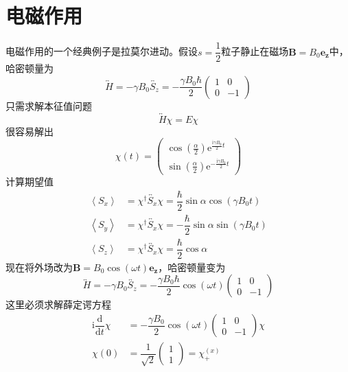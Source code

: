 \documentclass[12pt, a4paper, oneside]{ctexart}
\begin{document}
	\section{电磁作用}
	电磁作用的一个经典例子是拉莫尔进动。假设$s=\dfrac{1}{2}$粒子静止在磁场$\boldsymbol{B}=B_{0}\boldsymbol{e_{z}}$中，哈密顿量为
	\begin{equation}
		\overleftrightarrow{H}=-\gamma B_{0}\overleftrightarrow{S_{z}}=-\dfrac{\gamma B_{0}\hbar}{2}\begin{pmatrix}
			1	& 0\\
			0	&-1
		\end{pmatrix}
	\end{equation}
	\quad\quad 只需求解本征值问题
	\begin{equation}
		\overleftrightarrow{H}\chi=E\chi
	\end{equation}
	\quad\quad 很容易解出
	\begin{equation}
		\chi(t)=\begin{pmatrix}
		\cos(\frac{\alpha}{2})\mathrm{e}^{\frac{\mathrm{i}\gamma B_{0}}{2}t}	\\\sin(\frac{\alpha}{2})\mathrm{e}^{-\frac{\mathrm{i}\gamma B_{0}}{2}t}
		\end{pmatrix}
	\end{equation}
	\quad\quad 计算期望值
	\begin{align}
		\left<S_{x}\right>&=\chi^{\dagger}\overleftrightarrow{S_{x}}\chi=\dfrac{\hbar}{2}\sin\alpha\cos\left(\gamma B_{0}t\right)\\
		\left<S_{y}\right>&=\chi^{\dagger}\overleftrightarrow{S_{x}}\chi=-\dfrac{\hbar}{2}\sin\alpha\sin\left(\gamma B_{0}t\right)\\
		\left<S_{z}\right>&=\chi^{\dagger}\overleftrightarrow{S_{x}}\chi=\dfrac{\hbar}{2}\cos\alpha
	\end{align}
	\quad\quad 现在将外场改为$\boldsymbol{B}=B_{0}\cos\left(\omega t\right)\boldsymbol{e_{z}}$，哈密顿量变为
	\begin{equation}
		\overleftrightarrow{H}=-\gamma B_{0}\overleftrightarrow{S_{z}}=-\dfrac{\gamma B_{0}\hbar}{2}\cos\left(\omega t\right)\begin{pmatrix}
			1	& 0\\
			0	&-1
		\end{pmatrix}
	\end{equation}
	\quad\quad 这里必须求解薛定谔方程
	\begin{align}
		\mathrm{i}\dfrac{\mathrm{d}}{\mathrm{d}t}\chi&=-\dfrac{\gamma B_{0}}{2}\cos\left(\omega t\right)\begin{pmatrix}
			1	& 0\\
			0	&-1
		\end{pmatrix}\chi\\
		\chi(0)&=\dfrac{1}{\sqrt{2}}\begin{pmatrix}
			1\\
			1
		\end{pmatrix}=\chi_{+}^{\left(x\right)}
	\end{align}
\end{document}
